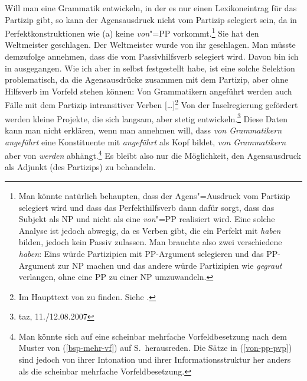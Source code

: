 Will man eine Grammatik entwickeln, in der es nur einen Lexikoneintrag für das Partizip gibt,
so kann der Agensausdruck nicht vom Partizip selegiert sein, da in Perfektkonstruktionen
wie (a) keine \emph{von}"=PP vorkommt.\footnote{
  Man könnte natürlich behaupten, dass der Agens"=Ausdruck vom Partizip selegiert wird
  und dass das Perfekthilfsverb dann dafür sorgt, dass das Subjekt als NP und 
  nicht als eine \emph{von}"=PP realisiert wird. Eine solche Analyse ist jedoch abwegig,
  da es Verben gibt, die ein Perfekt mit \emph{haben} bilden, jedoch kein Passiv zulassen.
  \eal
  \zl
  Man brauchte also zwei verschiedene \emph{haben}: Eins würde Partizipien mit PP-Argument
  selegieren und das PP-Argument zur NP machen und das andere würde Partizipien wie \emph{gegraut}
  verlangen, ohne eine PP zu einer NP umzuwandeln.
}
\eal
\ex Sie hat den Weltmeister geschlagen.
\ex Der Weltmeister wurde von ihr geschlagen.
\zl
Man müsste demzufolge annehmen, dass die \vonpp vom Passivhilfsverb selegiert wird. Davon bin ich
in  ausgegangen. Wie ich aber in  selbst festgestellt habe, ist eine solche Selektion problematisch,
da die Agensausdrücke zusammen mit dem Partizip, aber ohne Hilfsverb im Vorfeld stehen können:
\eal
\label{von-pp-pvp}
\ex Von Grammatikern angeführt werden auch Fälle mit dem Partizip intransitiver Verben [\ldots]\footnote{
        Im Haupttext von  zu finden. Siehe .
}
\ex Von der Inselregierung gefördert werden kleine Projekte, die sich langsam, aber stetig
        entwickeln.\footnote{
          taz, 11./12.08.2007
}
\zl
Diese Daten kann man nicht erklären, wenn man annehmen will, dass \emph{von Grammatikern angeführt} eine
Konstituente mit \emph{angeführt} als Kopf bildet, \emph{von Grammatikern} aber von \emph{werden} abhängt.\footnote{
  Man könnte sich auf eine scheinbar mehrfache Vorfeldbesetzung nach dem Muster von (\ref{bsp-mehr-vf})
  auf S.\,\pageref{bsp-mehr-vf} herausreden. Die Sätze in (\ref{von-pp-pvp}) sind jedoch
  von ihrer Intonation und ihrer Informationsstruktur her anders als die scheinbar mehrfache Vorfeldbesetzung.%
}
Es bleibt also nur die Möglichkeit, den Agensausdruck als Adjunkt (des Partizips) zu behandeln.
\largerpage

